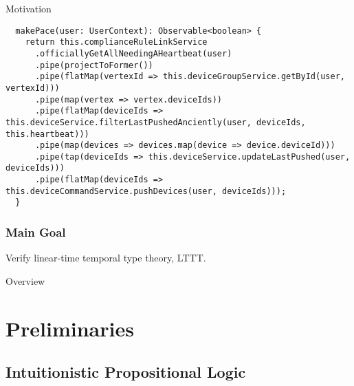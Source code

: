 \begin{frame}[t,plain]
\titlepage
\end{frame}

\renewcommand{\colon}{\mbox{~:~}}

\newcommand{\ang}[1]{\left\langle #1 \right\rangle}
\newcommand{\ceil}[1]{\left\lceil #1 \right\rceil}
\newcommand{\floor}[1]{\left\lfloor #1 \right\rfloor}
\renewcommand{\diamond}{\lozenge}
\newcommand{\T}{\mathfrak{T}}
\newcommand{\A}{\mathfrak{A}}
\renewcommand{\t}{\mathfrak{t}}
\newcommand{\e}{\mathfrak{e}}
\renewcommand{\v}{\mathfrak{v}}
\newcommand{\n}{\mathfrak{n}}
\newcommand{\dbrack}[1]{\left\llbracket #1 \right\rrbracket}

\newcommand{\angkv}{\langle k, v \rangle}
\newcommand{\angkvp}{\langle k', v' \rangle}

\begin{frame}[fragile]{Motivation}
    \begin{verbatim}
  makePace(user: UserContext): Observable<boolean> {
    return this.complianceRuleLinkService
      .officiallyGetAllNeedingAHeartbeat(user)
      .pipe(projectToFormer())
      .pipe(flatMap(vertexId => this.deviceGroupService.getById(user, vertexId)))
      .pipe(map(vertex => vertex.deviceIds))
      .pipe(flatMap(deviceIds => this.deviceService.filterLastPushedAnciently(user, deviceIds, this.heartbeat)))
      .pipe(map(devices => devices.map(device => device.deviceId)))
      .pipe(tap(deviceIds => this.deviceService.updateLastPushed(user, deviceIds)))
      .pipe(flatMap(deviceIds => this.deviceCommandService.pushDevices(user, deviceIds)));
  }
    \end{verbatim}
\end{frame}

\begin{frame}[fragile]
    \frametitle{Main Goal}
  
    Verify linear-time temporal type theory, LTTT.
\end{frame}

\begin{frame}{Overview}
\tableofcontents
\end{frame}

\section{Preliminaries}

\subsection{Intuitionistic Propositional Logic}

